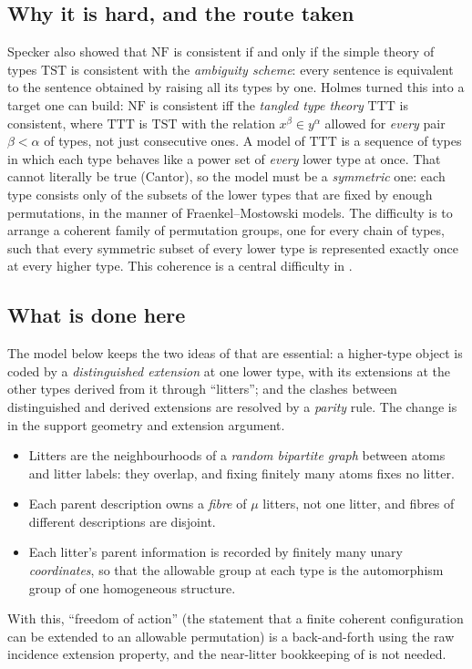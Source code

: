 \documentclass[11pt]{article}
\theoremstyle{definition}
\theoremstyle{remark}
\newcommand{\NF}{\mathrm{NF}}
\newcommand{\TTT}{\mathrm{TTT}}
\newcommand{\TST}{\mathrm{TST}}
\begin{document}
\subsection{Why it is hard, and the route taken}
Specker also showed \cite{Specker62} that \(\NF\) is consistent if and only
if the simple theory of types \(\TST\) is consistent with the
\emph{ambiguity scheme}: every sentence is equivalent to the sentence
obtained by raising all its types by one. Holmes \cite{Holmes95} turned
this into a target one can build: \(\NF\) is consistent iff the
\emph{tangled type theory} \(\TTT\) is consistent, where \(\TTT\) is
\(\TST\) with the relation \(x^\beta\in y^\alpha\) allowed for \emph{every}
pair \(\beta<\alpha\) of types, not just consecutive ones. A model of
\(\TTT\) is a sequence of types in which each type behaves like a power
set of \emph{every} lower type at once. That cannot literally be true
(Cantor), so the model must be a \emph{symmetric} one: each type consists
only of the subsets of the lower types that are fixed by enough
permutations, in the manner of Fraenkel--Mostowski models. The difficulty
is to arrange a coherent family of permutation groups, one for every
chain of types, such that every symmetric subset of every lower type is
represented exactly once at every higher type. This coherence is a central difficulty in \cite{HW}.

\subsection{What is done here}
The model below keeps the two ideas of \cite{HW} that are essential: a
higher-type object is coded by a \emph{distinguished extension} at one
lower type, with its extensions at the other types derived from it through
``litters''; and the clashes between distinguished and derived extensions
are resolved by a \emph{parity} rule. The change is in the support geometry and extension argument.
\begin{itemize}[nosep]
\item Litters are the neighbourhoods of a \emph{random bipartite graph}
 between atoms and litter labels: they overlap, and fixing finitely many
 atoms fixes no litter.
\item Each parent description owns a \emph{fibre} of \(\mu\) litters, not
 one litter, and fibres of different descriptions are disjoint.
\item Each litter's parent information is recorded by finitely many unary
 \emph{coordinates}, so that the allowable group at each type is
 the automorphism group of one homogeneous structure.
\end{itemize}
With this, ``freedom of action'' (the statement that a finite coherent
configuration can be extended to an allowable permutation) is a
back-and-forth using the raw incidence extension property, and the near-litter bookkeeping
of \cite{HW} is not needed.
\end{document}

